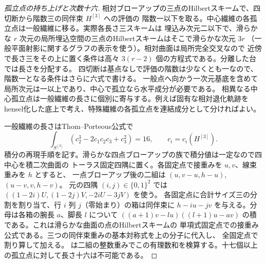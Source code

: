 \begin{proof}[孤立点の持ち上げと次数十六]
相対ブローアップの三点のHilbertスキームで、四切断から階数三の同伴束 $H^{[3]}$ への評価の
階数一以下を取る。中心繊維の各孤立点は一般繊維に移る。実際各長さ三スキームは
埋込み次元二以下で、滑らかな $r$ 次元の局所埋込空間の三点のHilbertスキームはそこで滑らかな次元 $3r$
（一般平面射影に関するグラフの表示を使う）。相対曲面は局所完全交叉なので
近傍で長さ三をその上に置く条件は高々 $3(r-2)$ 個の方程式である。分離した台では長さを分配する。
四切断は基点なしで評価の階数は少なくとも一なので、階数一となる条件はさらに六式で書ける。
一般点へ向かう一次元基底を含めて局所次元は一以上であり、中心で孤立なら水平成分が必要である。
相異なる中心孤立点は一般繊維の長さに個別に寄与する。例えば固有な相対退化軌跡を
hensel化した底上で考え、特殊繊維の各孤立点を連結成分として分ければよい。

一般繊維の長さはThom--Porteous公式で
\[
 \int_{S^{[3]}}(c_2^3-2c_1c_2c_3+c_3^2)=16,\qquad c_i=c_i(H^{[3]}).
\]
積分の再現手順を記す。滑らかな四点ブローアップの族で積分値は一定なので四中心を積二次曲面の
トーラス固定四隅に置く。各固定点で接重みを $u,v$、線束重みを $h$ とすると、
一点ブローアップ後の二組は $(u,v-u,h-u)$, $(u-v,v,h-v)$。
元の四隅 $(i,j)\in\{0,1\}^2$ では $((1-2i)U,(1-2j)V,-2iU-3jV)$ を使う。
各固定点に合計サイズ三の分割を割り当て、行 $i$ 列 $j$（零始まり）の箱は同伴束に
$h-iu-jv$ を与える。分母は各箱の腕長 $a$、脚長 $l$ について
$((a+1)v-lu)((l+1)u-av)$ の積である。これは滑らかな曲面の点のHilbertスキームの
単項式固定点での接重み公式である。三つの同伴束重みの基本対称式を上の分子に代入し、
全固定点で割り算して加える。
は二組の整数重みでこの有理数和を検算する。十七個以上の孤立点に対して長さ十六は不可能である。
\end{proof}

